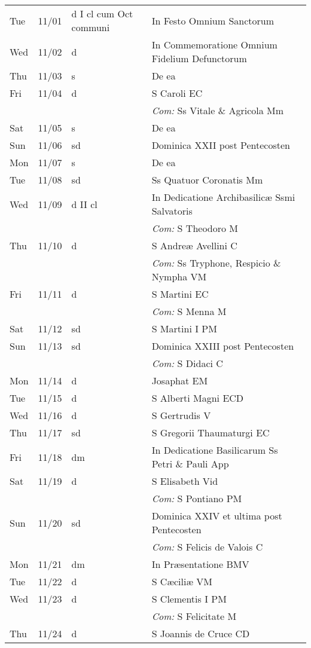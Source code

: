 \documentclass[10pt]{article}
\begin{document}
\begin{longtable}{ l l l l }
Tue & 11/01 & d I cl cum Oct communi & In Festo Omnium Sanctorum\\
Wed & 11/02 & d & In Commemoratione Omnium Fidelium Defunctorum\\
Thu & 11/03 & s & De ea\\
Fri & 11/04 & d & S Caroli EC\\
 & & & \textit{Com:} Ss Vitale \& Agricola Mm\\
Sat & 11/05 & s & De ea\\
Sun & 11/06 & sd & Dominica XXII post Pentecosten\\
Mon & 11/07 & s & De ea\\
Tue & 11/08 & sd & Ss Quatuor Coronatis Mm\\
Wed & 11/09 & d II cl & In Dedicatione Archibasilicæ Ssmi Salvatoris\\
 & & & \textit{Com:} S Theodoro M\\
Thu & 11/10 & d & S Andreæ Avellini C\\
 & & & \textit{Com:} Ss Tryphone, Respicio \& Nympha VM\\
Fri & 11/11 & d & S Martini  EC\\
 & & & \textit{Com:} S Menna M\\
Sat & 11/12 & sd & S Martini I PM\\
Sun & 11/13 & sd & Dominica XXIII post Pentecosten\\
 & & & \textit{Com:} S Didaci C\\
Mon & 11/14 & d & Josaphat EM\\
Tue & 11/15 & d & S Alberti Magni ECD\\
Wed & 11/16 & d & S Gertrudis V\\
Thu & 11/17 & sd & S Gregorii Thaumaturgi EC\\
Fri & 11/18 & dm & In Dedicatione Basilicarum Ss Petri \& Pauli App\\
Sat & 11/19 & d & S Elisabeth Vid\\
 & & & \textit{Com:} S Pontiano PM\\
Sun & 11/20 & sd & Dominica XXIV et ultima post Pentecosten\\
 & & & \textit{Com:} S Felicis de Valois C\\
Mon & 11/21 & dm & In Præsentatione BMV\\
Tue & 11/22 & d & S Cæciliæ VM\\
Wed & 11/23 & d & S Clementis I PM\\
 & & & \textit{Com:} S Felicitate M\\
Thu & 11/24 & d & S Joannis de Cruce CD\\

\end{longtable}
\end{document}
